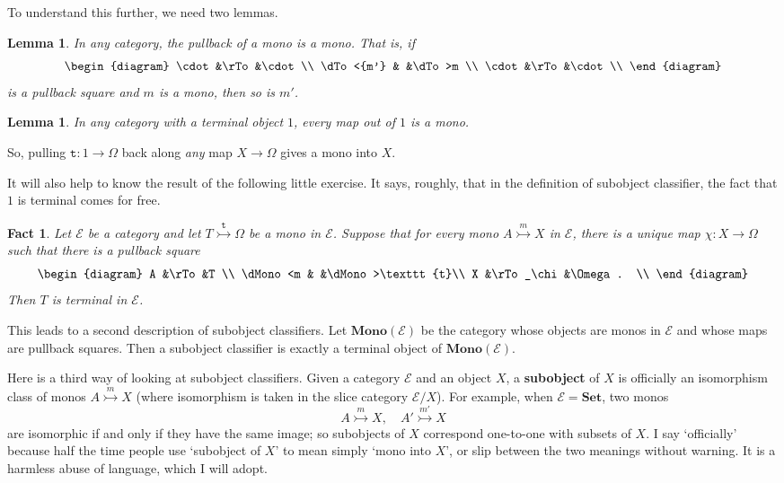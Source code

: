 \documentclass[12pt]{article}
\newcommand{\cat}[1]{\mathscr{#1}}
\newcommand{\fcat}[1]{\mathbf{#1}}
\newcommand{\Set}{\fcat{Set}}
\newcommand{\demph}[1]{\textbf{\textup{#1}}}
\newcommand{\tr}{\texttt{t}}
\newcommand{\E}{\cat{E}}
\newcommand{\Mono}{\fcat{Mono}}
\newcommand{\monic}{\rightarrowtail}
\newcommand{\monicby}[1]{\stackrel{#1}{\monic}}
\newcommand{\cln}{\colon}
\newtheorem{lemma}[thm]{Lemma}
\newtheorem{fact}[thm]{Fact}
\begin{document}
To understand this further, we need two lemmas.

\begin{lemma}   \label{lemma:pb-mono}
In any category, the pullback of a mono is a mono.  That is, if
\[
\begin{diagram}
\cdot           &\rTo   &\cdot  \\
\dTo<{m'}       &       &\dTo>m \\
\cdot           &\rTo   &\cdot  \\
\end{diagram}
\]
is a pullback square and $m$ is a mono, then so is $m'$.  
\end{lemma}

\begin{lemma}
In any category with a terminal object $1$, every map out of $1$ is a mono.
\end{lemma}

So, pulling $\tr\cln 1 \to \Omega$ back along \emph{any} map $X \to \Omega$
gives a mono into $X$.

It will also help to know the result of the following little exercise.  It
says, roughly, that in the definition of subobject classifier, the fact that
$1$ is terminal comes for free.

\begin{fact}    \label{fact:one-terminal}
Let $\E$ be a category and let $T \monicby{\tr} \Omega$ be a mono in $\E$.
Suppose that for every mono $A \monicby{m} X$ in $\E$, there is a unique map
$\chi\cln X \to \Omega$ such that there is a pullback square
\[
\begin{diagram}
A               &\rTo           &T              \\
\dMono<m        &               &\dMono>\tr     \\
X               &\rTo_\chi      &\Omega.        \\
\end{diagram}
\]
Then $T$ is terminal in $\E$.
\end{fact}

This leads to a second description of subobject classifiers.  Let $\Mono(\E)$
be the category whose objects are monos in $\E$ and whose maps are pullback
squares.  Then a subobject classifier is exactly a terminal object of
$\Mono(\E)$.  

Here is a third way of looking at subobject classifiers.  Given a category
$\E$ and an object $X$, a \demph{subobject} of $X$ is officially an
isomorphism class of monos $A \monicby{m} X$ (where isomorphism is taken in the
slice category $\E/X$).  For example, when $\E = \Set$, two monos
\[
A \monicby{m} X, 
\quad
A' \monicby{m'} X
\]
are isomorphic if and only if they have the same image; so subobjects of $X$
correspond one-to-one with subsets of $X$.  I say `officially' because half
the time people use `subobject of $X$' to mean simply `mono into $X$', or slip
between the two meanings without warning.  It is a harmless abuse of
language, which I will adopt.   
\end{document}
